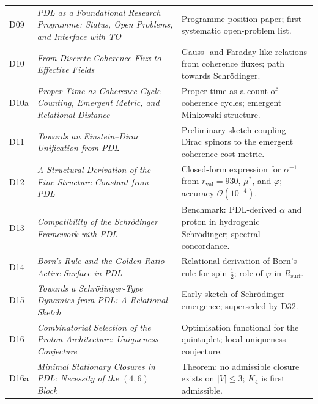 \documentclass[11pt,a4paper]{article}
\theoremstyle{plain}
\theoremstyle{definition}
\theoremstyle{remark}
\newcommand{\Kfour}{K_4}
\newcommand{\rval}{r_{\mathrm{val}}}
\newcommand{\Rsurf}{R_{\mathrm{surf}}}
\begin{document}
\begin{longtable}{@{}L{1.3cm}L{3.8cm}L{8.0cm}@{}}
D09 & \textit{PDL as a Foundational Research Programme: Status, Open Problems, and Interface with TO}~\citep{D09} & Programme position paper; first systematic open-problem list. \\[0.3em]

D10 & \textit{From Discrete Coherence Flux to Effective Fields}~\citep{D10} & Gauss- and Faraday-like relations from coherence fluxes; path towards Schr\"odinger. \\[0.3em]

D10a & \textit{Proper Time as Coherence-Cycle Counting, Emergent Metric, and Relational Distance}~\citep{D10a} & Proper time as a count of coherence cycles; emergent Minkowski structure. \\[0.3em]

D11 & \textit{Towards an Einstein--Dirac Unification from PDL}~\citep{D11} & Preliminary sketch coupling Dirac spinors to the emergent coherence-cost metric. \\[0.3em]

D12 & \textit{A Structural Derivation of the Fine-Structure Constant from PDL}~\citep{D12} & Closed-form expression for $\alpha^{-1}$ from $\rval=930$, $\mu^*$, and $\varphi$; accuracy $\mathcal{O}(10^{-4})$. \\[0.3em]

D13 & \textit{Compatibility of the Schr\"odinger Framework with PDL}~\citep{D13} & Benchmark: PDL-derived $\alpha$ and proton in hydrogenic Schr\"odinger; spectral concordance. \\[0.3em]

D14 & \textit{Born's Rule and the Golden-Ratio Active Surface in PDL}~\citep{D14} & Relational derivation of Born's rule for spin-$\tfrac{1}{2}$; role of $\varphi$ in $\Rsurf$. \\[0.3em]

D15 & \textit{Towards a Schr\"odinger-Type Dynamics from PDL: A Relational Sketch}~\citep{D15} & Early sketch of Schr\"odinger emergence; superseded by D32. \\[0.3em]

D16 & \textit{Combinatorial Selection of the Proton Architecture: Uniqueness Conjecture}~\citep{D16} & Optimisation functional for the quintuplet; local uniqueness conjecture. \\[0.3em]

D16a & \textit{Minimal Stationary Closures in PDL: Necessity of the $(4,6)$ Block}~\citep{D16a} & \textcolor{proofblue}{Theorem}: no admissible closure exists on $|V|\leq 3$; $\Kfour$ is first admissible. \\[0.3em]


\end{longtable}
\end{document}
